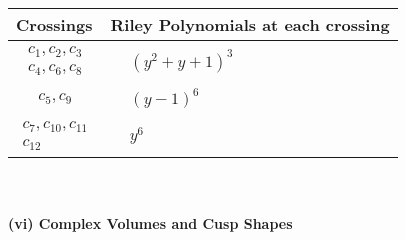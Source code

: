 \documentclass[1p]{elsarticle_modified}
\theoremstyle{definition}
\begin{document}
\begin{tabular}{m{50pt}|m{274pt}}
Crossings & \hspace{64pt}Riley Polynomials at each crossing \\
\hline $$\begin{aligned}c_{1},c_{2},c_{3}\\c_{4},c_{6},c_{8}\end{aligned}$$&$\begin{aligned}
&(y^2+y+1)^3
\end{aligned}$\\
\hline $$\begin{aligned}c_{5},c_{9}\end{aligned}$$&$\begin{aligned}
&(y-1)^6
\end{aligned}$\\
\hline $$\begin{aligned}c_{7},c_{10},c_{11}\\c_{12}\end{aligned}$$&$\begin{aligned}
&y^6
\end{aligned}$\\
\hline
\end{tabular}\\~\\
\newpage\flushleft \textbf{(vi) Complex Volumes and Cusp Shapes}
\end{document}
